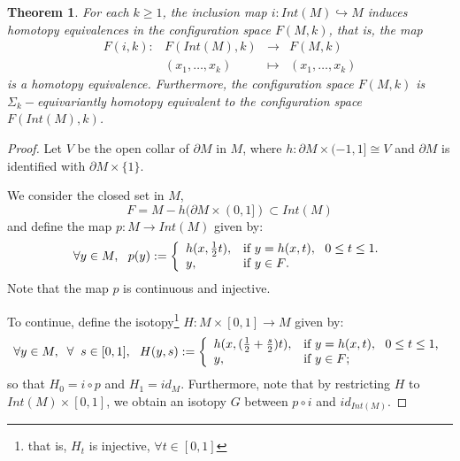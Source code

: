 \documentclass{amsart}
\newtheorem{thm}{Theorem}[section]
\theoremstyle{definition}
\numberwithin{equation}{section}
\begin{document}
 \begin{thm}\label{theor} 
 For each $k\geq 1$, the inclusion map $i:Int(M)\hookrightarrow M$ induces homotopy equivalences in the configuration space $F(M,k)$, that is, the map \begin{equation}
 \begin{array}{rccl}
 F(i,k):&F(Int(M),k)&\longrightarrow & F(M,k)\\&(x_1,\ldots,x_k)&\mapsto
 &(x_1,\ldots,x_k)
                           \end{array}
 \end{equation} is a homotopy equivalence. Furthermore, the configuration space $F(M,k)$ is $\Sigma_k-$equivariantly homotopy equivalent to the configuration space $F(Int(M),k)$.
\end{thm}
\begin{proof}
Let $V$ be the open collar of $\partial M$ in $M$, where $h:\partial M\times (-1,1]\cong V$ and $\partial M$ is identified with $\partial M\times \{1\}$.

We consider the closed set in $M$,\begin{equation}\label{F}
F=M-h(\partial M\times (0,1])\subset Int(M)
\end{equation} and define the map $p:M\longrightarrow Int(M)$ given by: \[ \forall
y\in M,~~
 p(y):=\left\{
              \begin{array}{ll}
                h(x,\frac{1}{2}t), & \hbox{if $y=h(x,t),~~0\leq t\leq 1$.} \\
                y, & \hbox{if $y\in F$.}
              \end{array}
            \right.
  \] Note that the map $p$ is continuous and injective.
  
  To continue, define the isotopy\footnote{that is, $H_t$ is injective, $\forall t\in [0,1]$} $H:M\times [0,1]\longrightarrow M$ given by: \[ \forall
y\in M, \;\; \forall \;\; s\in [0,1],~~
 H(y,s):=\left\{
              \begin{array}{ll}
                h(x,(\frac{1}{2}+\frac{s}{2})t), & \hbox{if $y=h(x,t),~~0\leq t\leq 1$,} \\
                y, & \hbox{if $y\in F$;}
              \end{array}
            \right.
  \] so that $H_0=i\circ p$ and $H_1=id_{M}$. Furthermore, note that by restricting $H$ to $Int(M)\times [0,1]$, we obtain an isotopy $G$ between $p\circ i$ and $id_{Int(M)}$.
  

\end{proof}
\end{document}
